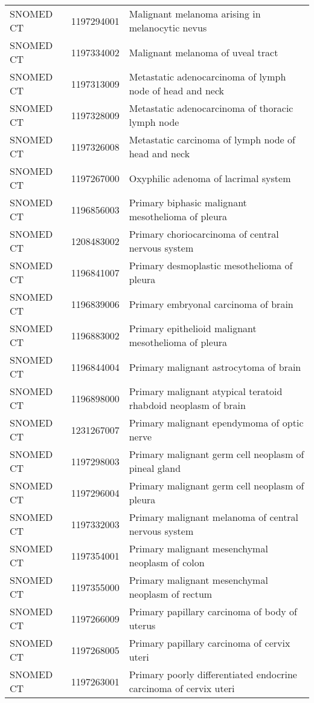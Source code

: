 \begin{longtable}{p{}p{}p{}}
  SNOMED CT & 1197294001 & Malignant melanoma arising in melanocytic nevus \\ 
  SNOMED CT & 1197334002 & Malignant melanoma of uveal tract \\ 
  SNOMED CT & 1197313009 & Metastatic adenocarcinoma of lymph node of head and neck \\ 
  SNOMED CT & 1197328009 & Metastatic adenocarcinoma of thoracic lymph node \\ 
  SNOMED CT & 1197326008 & Metastatic carcinoma of lymph node of head and neck \\ 
  SNOMED CT & 1197267000 & Oxyphilic adenoma of lacrimal system \\ 
  SNOMED CT & 1196856003 & Primary biphasic malignant mesothelioma of pleura \\ 
  SNOMED CT & 1208483002 & Primary choriocarcinoma of central nervous system \\ 
  SNOMED CT & 1196841007 & Primary desmoplastic mesothelioma of pleura \\ 
  SNOMED CT & 1196839006 & Primary embryonal carcinoma of brain \\ 
  SNOMED CT & 1196883002 & Primary epithelioid malignant mesothelioma of pleura \\ 
  SNOMED CT & 1196844004 & Primary malignant astrocytoma of brain \\ 
  SNOMED CT & 1196898000 & Primary malignant atypical teratoid rhabdoid neoplasm of brain \\ 
  SNOMED CT & 1231267007 & Primary malignant ependymoma of optic nerve \\ 
  SNOMED CT & 1197298003 & Primary malignant germ cell neoplasm of pineal gland \\ 
  SNOMED CT & 1197296004 & Primary malignant germ cell neoplasm of pleura \\ 
  SNOMED CT & 1197332003 & Primary malignant melanoma of central nervous system \\ 
  SNOMED CT & 1197354001 & Primary malignant mesenchymal neoplasm of colon \\ 
  SNOMED CT & 1197355000 & Primary malignant mesenchymal neoplasm of rectum \\ 
  SNOMED CT & 1197266009 & Primary papillary carcinoma of body of uterus \\ 
  SNOMED CT & 1197268005 & Primary papillary carcinoma of cervix uteri \\ 
  SNOMED CT & 1197263001 & Primary poorly differentiated endocrine carcinoma of cervix uteri \\ 

\end{longtable}
